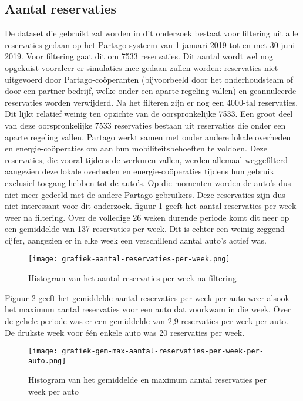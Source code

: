 \subsection{Aantal reservaties}
De dataset die gebruikt zal worden in dit onderzoek bestaat voor filtering uit alle reservaties gedaan op het Partago systeem van 1 januari 2019 tot en met 30 juni 2019. Voor filtering gaat dit om 7533 reservaties. Dit aantal wordt wel nog opgekuist vooraleer er simulaties mee gedaan zullen worden: reservaties niet uitgevoerd door Partago-coöperanten (bijvoorbeeld door het onderhoudsteam of door een partner bedrijf, welke onder een aparte regeling vallen) en geannuleerde reservaties worden verwijderd. Na het filteren zijn er nog een 4000-tal reservaties. Dit lijkt relatief weinig ten opzichte van de oorspronkelijke 7533. Een groot deel van deze oorspronkelijke 7533 reservaties bestaan uit reservaties die onder een aparte regeling vallen. Partago werkt samen met onder andere lokale overheden en energie-coöperaties om aan hun mobiliteitsbehoeften te voldoen. Deze reservaties, die vooral tijdens de werkuren vallen, werden allemaal weggefilterd aangezien deze lokale overheden en energie-coöperaties tijdens hun gebruik exclusief toegang hebben tot de auto's. Op die momenten worden de auto's dus niet meer gedeeld met de andere Partago-gebruikers. Deze reservaties zijn dus niet interessant voor dit onderzoek.
figuur \ref{grafiek:aantal-reservaties-per-week} geeft het aantal reservaties per week weer na filtering. Over de volledige 26 weken durende periode komt dit neer op een gemiddelde van 137 reservaties per week. Dit is echter een weinig zeggend cijfer, aangezien er in elke week een verschillend aantal auto's actief was. 
\begin{figure}[p]
	\texttt{[image: grafiek-aantal-reservaties-per-week.png]}
	\caption[Histogram van het aantal reservaties per week na filtering]{Histogram van het aantal reservaties per week na filtering}
	\label{grafiek:aantal-reservaties-per-week}
\end{figure}
Figuur \ref{grafiek:aantal-reservaties-per-week-per-auto} geeft het gemiddelde aantal reservaties per week per auto weer alsook het maximum aantal reservaties voor een auto dat voorkwam in die week. Over de gehele periode was er een gemiddelde van 2,9 reservaties per week per auto. De drukste week voor één enkele auto was 20 reservaties per week. 
\begin{figure}[p]
	\texttt{[image: grafiek-gem-max-aantal-reservaties-per-week-per-auto.png]}
	\caption[Histogram van het gemiddelde en maximum aantal reservaties per week per auto]{Histogram van het gemiddelde en maximum aantal reservaties per week per auto}
	\label{grafiek:aantal-reservaties-per-week-per-auto}
\end{figure}


